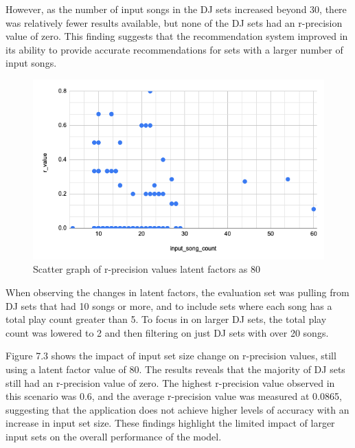 However, as the number of input songs in the DJ sets increased beyond 30, there was relatively fewer results available, but none of the DJ sets had an r-precision value of zero. This finding suggests that the recommendation system improved in its ability to provide accurate recommendations for sets with a larger number of input songs.

\begin{figure}[H]
	\includegraphics[scale=0.6]{images/80_little_sets}
	\centering
	\caption{Scatter graph of r-precision values latent factors as 80} 
\end{figure}


When observing the changes in latent factors, the evaluation set was pulling from DJ sets that had 10 songs or more, and to include sets where each song has a total play count greater than 5. To  focus in on larger DJ sets, the total play count was lowered to 2 and then filtering on just DJ sets with over 20 songs.

Figure 7.3 shows the impact of input set size change on r-precision values, still using a latent factor value of 80. The results reveals  that the majority of DJ sets still had an r-precision value of zero. The highest r-precision value observed in this scenario was 0.6, and the average r-precision value was measured at 0.0865, suggesting that the application does not achieve higher levels of accuracy with an increase in input set size. These findings highlight the limited impact of larger input sets on the overall performance of the model.

